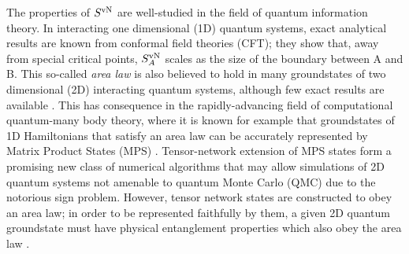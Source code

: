 \documentclass[prl,aps,twocolumn,floatfix,amsmath,amssymb,superscriptaddress,tightenlines]{revtex4}
\begin{document}
The properties of $S^{ \rm vN}$ are well-studied in the field of quantum information theory.
In interacting one dimensional (1D) quantum systems, exact analytical results are known from conformal
field theories (CFT); they show that, away from special critical points,
$S^{ \rm vN}_A$ scales as the size of the boundary between A and B.
This so-called {\it area law} \cite{Shredder} is also believed to hold in many
groundstates of two dimensional (2D) interacting quantum systems,
although few exact results are available \cite{ALreview}.  This has 
consequence in the
rapidly-advancing field of computational quantum-many body theory, where
it is known for example that groundstates of 1D Hamiltonians that satisfy an area law
can be accurately represented by Matrix Product States (MPS) \cite{MPS_DMRG}.
Tensor-network extension of MPS states form a promising new class of numerical algorithms \cite{PEPS1} 
that may allow simulations of 2D quantum systems not amenable to quantum Monte Carlo (QMC) due to
the notorious sign problem.  However, tensor network states
are constructed to obey an area law; in order to be represented faithfully
by them, a given 2D quantum groundstate must have physical entanglement
properties which also obey the area law \cite{ALreview}.


\end{document}
